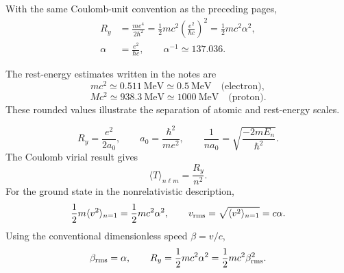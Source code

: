 With the same Coulomb-unit convention as the preceding pages,
\begin{align*}
 R_y&=\frac{me^4}{2\hbar^2}
 =\frac12mc^2\left(\frac{e^2}{\hbar c}\right)^2
 =\frac12mc^2\alpha^2,\\
 \alpha&=\frac{e^2}{\hbar c},\qquad
 \alpha^{-1}\simeq137.036.
\end{align*}

The rest-energy estimates written in the notes are
\[
 mc^2\simeq0.511\ \mathrm{MeV}\simeq0.5\ \mathrm{MeV}
 \quad\text{(electron)},
\]
\[
 Mc^2\simeq938.3\ \mathrm{MeV}\simeq1000\ \mathrm{MeV}
 \quad\text{(proton)}.
\]
These rounded values illustrate the separation of atomic and
rest-energy scales.

\[
 R_y=\frac{e^2}{2a_0},\qquad
 a_0=\frac{\hbar^2}{me^2},\qquad
 \frac1{na_0}=\sqrt{\frac{-2mE_n}{\hbar^2}}.
\]
The Coulomb virial result gives
\[
 \langle T\rangle_{n\ell m}=\frac{R_y}{n^2}.
\]
For the ground state in the nonrelativistic description,
\[
 \frac12m\langle v^2\rangle_{n=1}
 =\frac12mc^2\alpha^2,
 \qquad
 v_{\rm rms}=\sqrt{\langle v^2\rangle_{n=1}}=c\alpha.
\]
Using the conventional dimensionless speed $\beta=v/c$,
\[
 \beta_{\rm rms}=\alpha,\qquad
 R_y=\frac12mc^2\alpha^2
 =\frac12mc^2\beta_{\rm rms}^2.
\]
